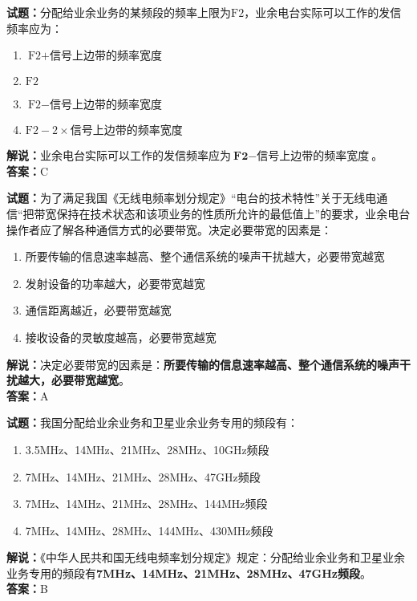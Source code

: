 \documentclass{ctexbook}
\begin{document}
\bigskip


\noindent\textbf{试题：}分配给业余业务的某频段的频率上限为\(\textrm{F2}\)，业余电台实际可以工作的发信频率应为：
\begin{enumerate}[leftmargin=3em]
\item \(\textrm{F2} + \textrm{信号上边带的频率宽度}\)
\item \(\textrm{F2}\)
\item \(\textrm{F2} - \textrm{信号上边带的频率宽度}\)
\item \(\textrm{F2} - 2 \times \textrm{信号上边带的频率宽度}\)
\end{enumerate}
\noindent\textbf{解说：}业余电台实际可以工作的发信频率应为\(\textbf{F2} - \textbf{信号上边带的频率宽度}\)。
\\\noindent\textbf{答案：}C





\bigskip


\noindent\textbf{试题：}为了满足我国《无线电频率划分规定》“电台的技术特性”关于无线电通信“把带宽保持在技术状态和该项业务的性质所允许的最低值上”的要求，业余电台操作者应了解各种通信方式的必要带宽。决定必要带宽的因素是：
\begin{enumerate}[leftmargin=3em]
\item 所要传输的信息速率越高、整个通信系统的噪声干扰越大，必要带宽越宽
\item 发射设备的功率越大，必要带宽越宽
\item 通信距离越近，必要带宽越宽
\item 接收设备的灵敏度越高，必要带宽越宽
\end{enumerate}
\noindent\textbf{解说：}决定必要带宽的因素是：\textbf{所要传输的信息速率越高、整个通信系统的噪声干扰越大，必要带宽越宽}。\\\noindent\textbf{答案：}A



\bigskip


\noindent\textbf{试题：}我国分配给业余业务和卫星业余业务专用的频段有：
\begin{enumerate}[leftmargin=3em]
\item 3.5\unit{\MHz}、14\unit{\MHz}、21\unit{\MHz}、28\unit{\MHz}、10\unit{\GHz}频段
\item 7\unit{\MHz}、14\unit{\MHz}、21\unit{\MHz}、28\unit{\MHz}、47\unit{\GHz}频段
\item 7\unit{\MHz}、14\unit{\MHz}、21\unit{\MHz}、28\unit{\MHz}、144\unit{\MHz}频段
\item 7\unit{\MHz}、14\unit{\MHz}、28\unit{\MHz}、144\unit{\MHz}、430\unit{\MHz}频段
\end{enumerate}
\noindent\textbf{解说：}《中华人民共和国无线电频率划分规定》规定：分配给业余业务和卫星业余业务专用的频段有\textbf{7\unit{\MHz}、14\unit{\MHz}、21\unit{\MHz}、28\unit{\MHz}、47\unit{\GHz}频段}。\\\noindent\textbf{答案：}B
\end{document}

